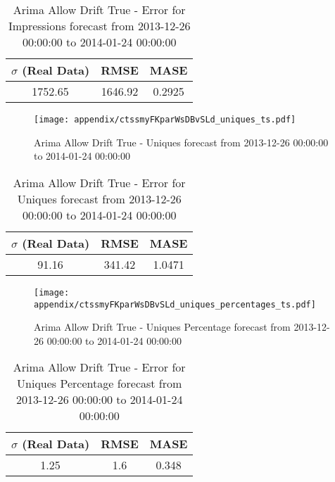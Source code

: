 \begin{table}[H]
\centering
\footnotesize
\begin{tabular}{ccc}
$\sigma$ (Real Data) & RMSE & MASE   \\ \hline
1752.65 & 1646.92 & 0.2925 \\
\end{tabular}

\vspace{0.5cm}

\caption{
Arima Allow Drift True - Error for Impressions forecast from 2013-12-26 00:00:00 to 2014-01-24 00:00:00}
\end{table}

\begin{figure}[H] \begin{center} \leavevmode
\texttt{[image: appendix/ctssmyFKparWsDBvSLd\_uniques\_ts.pdf]} \caption{
Arima Allow Drift True - Uniques forecast from 2013-12-26 00:00:00 to 2014-01-24 00:00:00} \label{fig:appendix/ctssmyFKparWsDBvSLd_uniques_ts.pdf} \end{center}
\end{figure}

\begin{table}[H]
\centering
\footnotesize
\begin{tabular}{ccc}
$\sigma$ (Real Data) & RMSE & MASE   \\ \hline
91.16 & 341.42 & 1.0471 \\
\end{tabular}

\vspace{0.5cm}

\caption{
Arima Allow Drift True - Error for Uniques forecast from 2013-12-26 00:00:00 to 2014-01-24 00:00:00}
\end{table}

\begin{figure}[H] \begin{center} \leavevmode
\texttt{[image: appendix/ctssmyFKparWsDBvSLd\_uniques\_percentages\_ts.pdf]} \caption{
Arima Allow Drift True - Uniques Percentage forecast from 2013-12-26 00:00:00 to 2014-01-24 00:00:00} \label{fig:appendix/ctssmyFKparWsDBvSLd_uniques_percentages_ts.pdf} \end{center}
\end{figure}

\begin{table}[H]
\centering
\footnotesize
\begin{tabular}{ccc}
$\sigma$ (Real Data) & RMSE & MASE   \\ \hline
1.25 & 1.6 & 0.348 \\
\end{tabular}

\vspace{0.5cm}

\caption{
Arima Allow Drift True - Error for Uniques Percentage forecast from 2013-12-26 00:00:00 to 2014-01-24 00:00:00}
\end{table}

